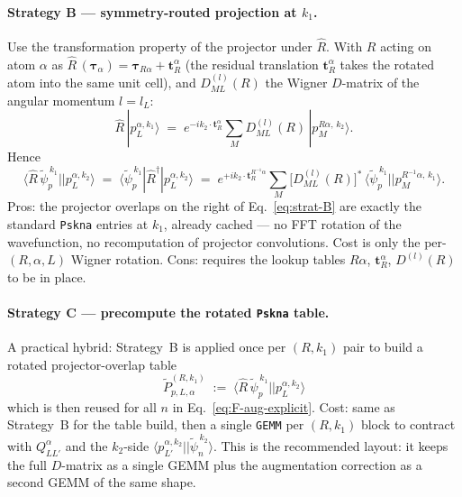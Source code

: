 \documentclass[11pt]{article}
\newcommand{\ket}[1]{| #1 \rangle}
\newcommand{\matel}[3]{\langle #1 | #2 | #3 \rangle}
\newcommand{\rotpsipt}[2]{\hat{R}\,\widetilde{\psi}_{#1}^{\,#2}}
\newcommand{\psipt}[2]{\widetilde{\psi}_{#1}^{\,#2}}
\begin{document}
\paragraph{Strategy B --- symmetry-routed projection at $k_1$.}
Use the transformation property of the projector under $\hat{R}$. With
$R$ acting on atom $\alpha$ as
$\hat{R}\,(\boldsymbol{\tau}_\alpha) = \boldsymbol{\tau}_{R\alpha}
+ \mathbf{t}_R^{\alpha}$ (the residual translation $\mathbf{t}_R^{\alpha}$
takes the rotated atom into the same unit cell), and $D^{(l)}_{ML}(R)$
the Wigner $D$-matrix of the angular momentum $l = l_L$:
\begin{equation}
  \hat{R}\,\ket{p_L^{\alpha, k_1}}
  \;=\; e^{-i k_2 \cdot \mathbf{t}_R^{\alpha}}
        \sum_{M} D^{(l)}_{ML}(R)\,
        \ket{p_M^{R\alpha,\, k_2}}.
\end{equation}
Hence
\begin{equation}
  \matel{\rotpsipt{p}{k_1}}{}{p_L^{\alpha, k_2}}
  \;=\; \matel{\psipt{p}{k_1}}{\hat{R}^{\dagger}}{p_L^{\alpha, k_2}}
  \;=\; e^{+i k_2 \cdot \mathbf{t}_R^{R^{-1}\alpha}}
        \sum_{M}\!\big[D^{(l)}_{ML}(R)\big]^{*}\,
        \matel{\psipt{p}{k_1}}{}{p_M^{R^{-1}\alpha,\, k_1}}.
  \label{eq:strat-B}
\end{equation}
Pros: the projector overlaps on the right of Eq.~\eqref{eq:strat-B}
are exactly the standard \texttt{Pskna} entries at $k_1$, already
cached --- no FFT rotation of the wavefunction, no recomputation of
projector convolutions. Cost is only the per-$(R,\alpha,L)$ Wigner
rotation. Cons: requires the lookup tables $R\alpha$,
$\mathbf{t}_R^{\alpha}$, $D^{(l)}(R)$ to be in place.

\paragraph{Strategy C --- precompute the rotated \texttt{Pskna} table.}
A practical hybrid: Strategy~B is applied once per $(R, k_1)$ pair to
build a rotated projector-overlap table
\begin{equation}
  \widetilde{P}^{(R, k_1)}_{p, L, \alpha}
  \;:=\; \matel{\rotpsipt{p}{k_1}}{}{p_L^{\alpha, k_2}}
\end{equation}
which is then reused for all $n$ in
Eq.~\eqref{eq:F-aug-explicit}. Cost: same as Strategy~B for the table
build, then a single \texttt{GEMM} per $(R, k_1)$ block to contract
with $Q^{\alpha}_{LL'}$ and the $k_2$-side
$\matel{p_{L'}^{\alpha, k_2}}{}{\psipt{n}{k_2}}$. This is the
recommended layout: it keeps the full $D$-matrix as a single GEMM
plus the augmentation correction as a second GEMM of the same shape.
\end{document}
